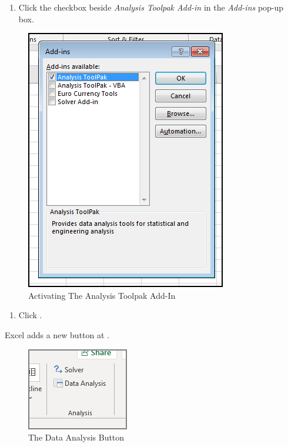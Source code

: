 \begin{enumerate}[resume]	
	
	\item Click the checkbox beside \textit{Analysis Toolpak Add-in} in the \textit{Add-ins} pop-up box. 
	
\end{enumerate}

\begin{figure}[H]
	\centering
	\includegraphics[width=\maxwidth{.75\linewidth}]{gfx/ch09_fig52}
	\caption{Activating The Analysis Toolpak Add-In}
	\label{09:fig52}
\end{figure}

\begin{enumerate}[resume]	
	\item Click .
\end{enumerate}

Excel adds a new button at .

\begin{figure}[H]
	\centering
	\includegraphics[width=\maxwidth{.50\linewidth}]{gfx/ch09_fig53}
	\caption{The Data Analysis Button}
	\label{09:fig53}
\end{figure}


